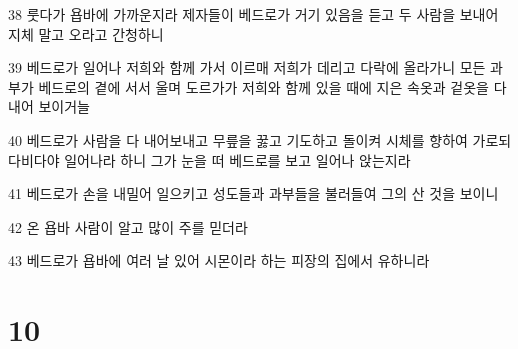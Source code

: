 \par 38 룻다가 욥바에 가까운지라 제자들이 베드로가 거기 있음을 듣고 두 사람을 보내어 지체 말고 오라고 간청하니
\par 39 베드로가 일어나 저희와 함께 가서 이르매 저희가 데리고 다락에 올라가니 모든 과부가 베드로의 곁에 서서 울며 도르가가 저희와 함께 있을 때에 지은 속옷과 겉옷을 다 내어 보이거늘
\par 40 베드로가 사람을 다 내어보내고 무릎을 꿇고 기도하고 돌이켜 시체를 향하여 가로되 다비다야 일어나라 하니 그가 눈을 떠 베드로를 보고 일어나 앉는지라
\par 41 베드로가 손을 내밀어 일으키고 성도들과 과부들을 불러들여 그의 산 것을 보이니
\par 42 온 욥바 사람이 알고 많이 주를 믿더라
\par 43 베드로가 욥바에 여러 날 있어 시몬이라 하는 피장의 집에서 유하니라

\chapter{10}

